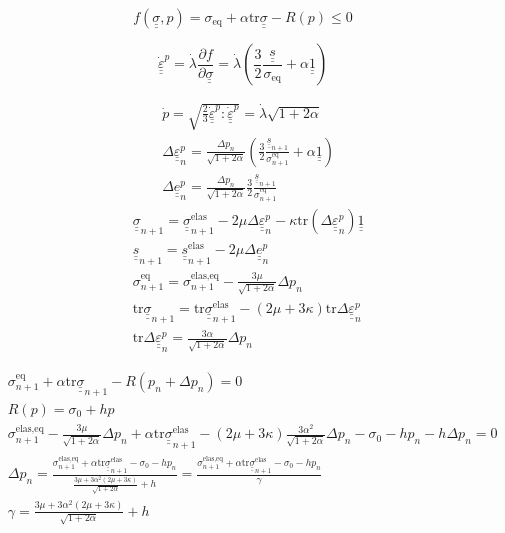 \documentclass[12pt]{article}
\newcommand\ul[1]{\underline{#1}}
\newcommand\uusigma{\ul{\ul{\sigma}}}
\newcommand\uus{\ul{\ul{s}}}
\newcommand\uue{\ul{\ul{e}}}
\newcommand\uuUnit{\ul{\ul{1}}}
\newcommand\uueps{\ul{\ul{\varepsilon}}}
\newcommand\Deltaepsp{\Delta \uueps_{n}^p}
\newcommand\Deltaep{\Delta \uue_{n}^p}
\newcommand\sigmaeqn{\sigma_{n+1}^\text{eq}}
\newcommand\sigmaeqnelas{\sigma_{n+1}^\text{elas,eq}}
\newcommand\uusn{\uus_{n+1}}
\newcommand\uusigman{\ul{\ul{\sigma}}_{n+1}}
\newcommand\uusigmanelas{\uusigman^{\text{elas}}}
\newcommand\mtr{\mathrm{tr}}
\begin{document}
\begin{equation}
    f(\uusigma, p) = \sigma_{\text{eq}} + \alpha \mtr \uusigma - R(p) \leq 0
\end{equation}

\begin{equation}
    \dot{\uueps}^p = \dot{\lambda} \frac{\partial f}{\partial \uusigma} = \dot{\lambda} \left(\frac{3}{2} \frac{\uus}{\sigma_\text{eq}} + \alpha \uuUnit \right)
\end{equation}

\begin{align}
    & \dot{p} = \sqrt{\frac{2}{3} \dot{\uueps}^p : \dot{\uueps}^p} = \dot{\lambda}\sqrt{1 + 2\alpha} \\
    & \Deltaepsp = \frac{\Delta p_n}{\sqrt{1 + 2\alpha}} \left( \frac{3}{2} \frac{\uusn}{\sigmaeqn} + \alpha \uuUnit \right) \\
    & \Deltaep = \frac{\Delta p_n}{\sqrt{1 + 2\alpha}} \frac{3}{2} \frac{\uusn}{\sigmaeqn} 
\end{align}
\begin{align}
    & \uusigma_{n+1} = \uusigma_{n+1}^\text{elas} - 2\mu \Deltaepsp - \kappa \mtr (\Deltaepsp) \uuUnit \\
    & \uus_{n+1} = \uus_{n+1}^\text{elas} - 2\mu\Delta\uue_n^p \\
    & \sigmaeqn = \sigmaeqnelas - \frac{3\mu}{\sqrt{1 + 2\alpha}}\Delta p_n \\
    & \mtr \uusigman = \mtr \uusigmanelas - (2 \mu + 3\kappa) \mtr \Deltaepsp \\
    & \mtr \Deltaepsp = \frac{3\alpha}{\sqrt{1 + 2\alpha}} \Delta p_n
\end{align}

\begin{align}
    & \sigmaeqn + \alpha \mtr \uusigman - R(p_n + \Delta p_n) = 0 \\
    & R(p) = \sigma_0 + h p \\
    & \sigmaeqnelas - \frac{3\mu}{\sqrt{1 + 2\alpha}}\Delta p_n + \alpha \mtr \uusigmanelas - (2 \mu + 3\kappa) \frac{3\alpha^2}{\sqrt{1 + 2\alpha}} \Delta p_n - \sigma_0 - h p_n - h \Delta p_n = 0 \\
    & \Delta p_n = \frac{ \sigmaeqnelas + \alpha \mtr \uusigmanelas - \sigma_0 - h p_n}{ \frac{3\mu + 3\alpha^2(2 \mu + 3\kappa)}{\sqrt{1 + 2\alpha}} + h} = \frac{ \sigmaeqnelas + \alpha \mtr \uusigmanelas - \sigma_0 - h p_n}{ \gamma } \\
    & \gamma = \frac{3\mu + 3\alpha^2(2 \mu + 3\kappa)}{\sqrt{1 + 2\alpha}} + h
\end{align}
\end{document}
